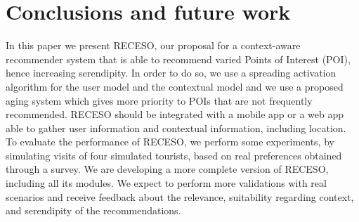 \section{Conclusions and future work} \label{section:conclu}

In this paper we present RECESO, our proposal for a context-aware recommender system that is able to recommend varied Points of Interest (POI), hence increasing serendipity. In order to do so, we use a spreading activation algorithm for the user model and the contextual model and we use a proposed aging system which gives more priority to POIs that are not frequently recommended. RECESO should be integrated with a mobile app or a web app able to gather user information and contextual information, including location. To evaluate the performance of RECESO, we perform some experiments, by simulating visits of four simulated tourists, based on real preferences obtained through a survey. We are developing a more complete version of RECESO, including all its modules. We expect to perform more validations with real scenarios and receive feedback about the relevance, suitability regarding context, and serendipity of the recommendations.

